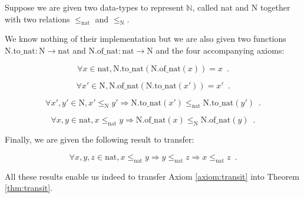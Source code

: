\documentclass{llncs}
\begin{document}
\begin{example}
    \label{expl:natN}
    Suppose we are given two data-types to represent $\mathbb{N}$,
    called nat and N together with two relations
    $\leq_{\mathrm{nat}}$ and $\leq_{\mathrm{N}}$.

    We know nothing of their implementation but we are also given two
    functions $\mathrm{N.to\_nat} : \mathrm{N} \rightarrow \mathrm{nat}$
    and $\mathrm{N.of\_nat} : \mathrm{nat} \rightarrow \mathrm{N}$
    and the four accompanying axioms:

    \begin{axiom}
        \label{axiom:surj2}
        \[
            \forall x \in \mathrm{nat}, \mathrm{N.to\_nat}( \mathrm{N.of\_nat}(x) ) = x \enspace .
        \]
    \end{axiom}

    \begin{axiom}
        \label{axiom:surj1}
        \[
            \forall x' \in \mathrm{N}, \mathrm{N.of\_nat}( \mathrm{N.to\_nat}(x') ) = x' \enspace .
        \]
    \end{axiom}

    \begin{axiom}
        \label{axiom:transf2}
        \[
            \forall x', y' \in \mathrm{N},
            x' \leq_{\mathrm{N}} y' \Rightarrow
            \mathrm{N.to\_nat}(x') \leq_{\mathrm{nat}}
            \mathrm{N.to\_nat}(y') \enspace .
        \]
    \end{axiom}

    \begin{axiom}
        \label{axiom:transf1}
        \[
            \forall x, y \in \mathrm{nat},
            x \leq_{\mathrm{nat}} y \Rightarrow
            \mathrm{N.of\_nat}(x) \leq_{\mathrm{N}} \mathrm{N.of\_nat}(y) \enspace .
        \]
    \end{axiom}
    Finally, we are given the following result to transfer:

\setcounter{theorem}{\value{axiom}}
    \begin{axiom}
        \label{axiom:transit}
        \[
            \forall x, y, z \in \mathrm{nat},
            x \leq_{\mathrm{nat}} y \Rightarrow
            y \leq_{\mathrm{nat}} z \Rightarrow x \leq_{\mathrm{nat}} z \enspace .
        \]
    \end{axiom}
    All these results enable us indeed to transfer Axiom \ref{axiom:transit}
    into Theorem \ref{thm:transit}.


\end{example}
\end{document}
